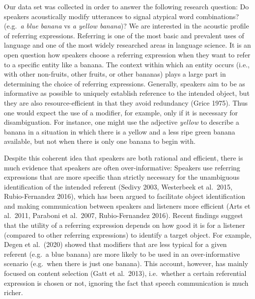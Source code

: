 \documentclass[
  english,
  man]{apa6}
\begin{document}
Our data set was collected in order to answer the following research question: Do speakers acoustically modify utterances to signal atypical word combinations? (e.g.~\emph{a blue banana} vs \emph{a yellow banana})?
We are interested in the acoustic profile of referring expressions.
Referring is one of the most basic and prevalent uses of language and one of the most widely researched areas in language science.
It is an open question how speakers choose a referring expression when they want to refer to a specific entity like a banana.
The context within which an entity occurs (i.e., with other non-fruits, other fruits, or other bananas) plays a large part in determining the choice of referring expressions.
Generally, speakers aim to be as informative as possible to uniquely establish reference to the intended object, but they are also resource-efficient in that they avoid redundancy (Grice 1975).
Thus one would expect the use of a modifier, for example, only if it is necessary for disambiguation.
For instance, one might use the adjective \emph{yellow} to describe a banana in a situation in which there is a yellow and a less ripe green banana available, but not when there is only one banana to begin with.

Despite this coherent idea that speakers are both rational and efficient, there is much evidence that speakers are often over-informative: Speakers use referring expressions that are more specific than strictly necessary for the unambiguous identification of the intended referent (Sedivy 2003, Westerbeek et al.~2015, Rubio-Fernandez 2016), which has been argued to facilitate object identification and making communication between speakers and listeners more efficient (Arts et al.~2011, Paraboni et al.~2007, Rubio-Fernandez 2016).
Recent findings suggest that the utility of a referring expression depends on how good it is for a listener (compared to other referring expressions) to identify a target object.
For example, Degen et al.~(2020) showed that modifiers that are less typical for a given referent (e.g.~a blue banana) are more likely to be used in an over-informative scenario (e.g.~when there is just one banana).
This account, however, has mainly focused on content selection (Gatt et al.~2013), i.e.~whether a certain referential expression is chosen or not, ignoring the fact that speech communication is much richer.
\end{document}
